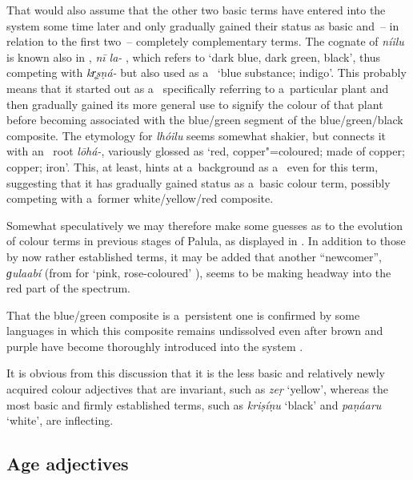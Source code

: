 That would also assume that the other two basic terms have entered into the system some time later
and only gradually gained their status as basic and~-- in relation to the first two~-- completely
complementary terms. The cognate of \textit{níilu} is known also in , \textit{nī la-}
\citep[7563]{turner1966}, which refers to `dark blue, dark green, black', thus competing with 
\textit{kr̥ṣṇá-} but also used as a~ `blue substance; indigo'. This probably means that it
started out as a~ specifically referring to a~particular plant and then gradually gained its
more general use to signify the colour of that plant before becoming associated with the blue/green
segment of the blue/green/black composite. The etymology for \textit{lhóilu} seems somewhat shakier,
but \citet[11168, 11158]{turner1966} connects it with an~ root \textit{lōhá-}, variously glossed
as `red, copper"=coloured; made of copper; copper; iron'. This, at least, hints at a~background as
a~ even for this term, suggesting that it has gradually gained status as a~basic colour term,
possibly competing with a~former white/yellow/red composite.



Somewhat speculatively we may therefore make some guesses as to the evolution of colour terms in previous stages of Palula, as displayed in . In addition to those by now rather established terms, it may be added that another ``newcomer'', \textit{ɡulaabí} (from  for `pink, rose-coloured' ), seems to be making headway into the red part of the spectrum.



That the blue/green composite is a~persistent one is confirmed by some languages in which this composite remains undissolved even after brown and purple have become thoroughly introduced into the system \citep[18]{kayetal1991}.



It is obvious from this discussion that it is the less basic and relatively newly acquired colour adjectives that are invariant, such as \textit{zeṛ} `yellow', whereas the most basic and firmly established terms, such as \textit{kriṣíṇu} `black' and \textit{paṇáaru} `white', are inflecting. 


\subsection{Age adjectives}
\label{subsec:6-2-3}


